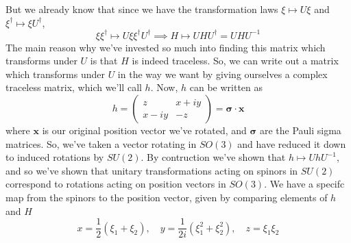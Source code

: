 But we already know that since we have the transformation laws $\xi \mapsto U \xi$ and $\xi^\dagger \mapsto \xi U^\dagger$, \[ 
\xi \xi^\dagger \mapsto U \xi \xi^\dagger U^\dagger \implies H \mapsto U H U^\dagger  = U H U^{ -1 }  \]
The main reason why we've invested so much into finding this matrix which transforms under $U$ is that $H$ is indeed traceless. So, we can write out a matrix which transforms under $U$ in the way we want by giving ourselves a complex traceless matrix, which we'll call $h$. Now, $h$ can be written as \[ h = \begin{pmatrix} z & x + iy \\ x - iy & - z  \end{pmatrix} = \mathbf {\sigma} \cdot \mathbf{x}  \] where $\mathbf{ x} $ is our original position vector we've rotated, and $\mathbf{\sigma} $ are the Pauli sigma matrices. So, we've taken a vector rotating in $SO ( 3) $ and have reduced it down to induced rotations by $SU(2) $. By contruction we've shown that $h \mapsto UhU^{ -1}$, and so we've shown that unitary transformations acting on spinors in $SU(2)$ correspond to rotations acting on position vectors in $SO ( 3) $. We have a specifc map from the spinors to the position vector, given by comparing elements of $h$ and $H$
\[ x = \frac{1}{ 2} ( \xi_1+ \xi_2), \quad y = \frac{ 1}{ 2i } (\xi_1^2 + \xi_2^2 ), \quad z = \xi_1 \xi_2 \] 


